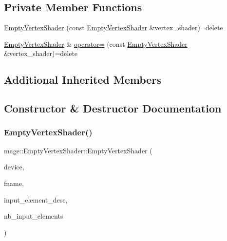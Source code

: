 \subsection*{Private Member Functions}
\begin{DoxyCompactItemize}
\item 
\hyperlink{classmage_1_1_empty_vertex_shader_a6ab1b22d108fde8f8876e6a2e4c0decb}{Empty\+Vertex\+Shader} (const \hyperlink{classmage_1_1_empty_vertex_shader}{Empty\+Vertex\+Shader} \&vertex\+\_\+shader)=delete
\item 
\hyperlink{classmage_1_1_empty_vertex_shader}{Empty\+Vertex\+Shader} \& \hyperlink{classmage_1_1_empty_vertex_shader_a2683d29127405d51737008637ebde098}{operator=} (const \hyperlink{classmage_1_1_empty_vertex_shader}{Empty\+Vertex\+Shader} \&vertex\+\_\+shader)=delete
\end{DoxyCompactItemize}
\subsection*{Additional Inherited Members}


\subsection{Constructor \& Destructor Documentation}
\hypertarget{classmage_1_1_empty_vertex_shader_adbdd0c863427d0b56f12050c0f8d7f7f}{}\label{classmage_1_1_empty_vertex_shader_adbdd0c863427d0b56f12050c0f8d7f7f} 
\subsubsection{\texorpdfstring{Empty\+Vertex\+Shader()}{EmptyVertexShader()}\hspace{0.1cm}{\footnotesize\ttfamily [1/2]}}
{\footnotesize\ttfamily mage\+::\+Empty\+Vertex\+Shader\+::\+Empty\+Vertex\+Shader (\begin{DoxyParamCaption}\item[{\hyperlink{namespacemage_ae74f374780900893caa5555d1031fd79}{Com\+Ptr}$<$ I\+D3\+D11\+Device2 $>$}]{device,  }\item[{const wstring \&}]{fname,  }\item[{const D3\+D11\+\_\+\+I\+N\+P\+U\+T\+\_\+\+E\+L\+E\+M\+E\+N\+T\+\_\+\+D\+E\+SC $\ast$}]{input\+\_\+element\+\_\+desc,  }\item[{uint32\+\_\+t}]{nb\+\_\+input\+\_\+elements }\end{DoxyParamCaption})}

